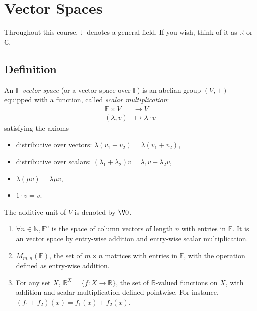\documentclass[a4paper]{article}
\theoremstyle{definition}
\begin{document}


\tableofcontents

\section{Vector Spaces}

\begin{convention}
  Throughout this course, $\mathbb{F}$ denotes a general field. If you wish, think of it as $\mathbb{R}$ or $\mathbb{C}$.
\end{convention}

\subsection{Definition}

\begin{definition}
  An $\mathbb{F}$-\emph{vector space} (or a vector space over $\mathbb{F}$) is an abelian group $(V, +)$ equipped with a function, called \emph{scalar multiplication}:
  \begin{align*}
    \mathbb{F}\times V &\to V \\
    (\lambda, v) &\mapsto \lambda\cdot v
  \end{align*}
  satisfying the axioms
  \begin{itemize}
  \item distributive over vectors: $\lambda(v_1+v_2) = \lambda(v_1+v_2)$,
  \item distributive over scalars: $(\lambda_1+\lambda_2)v= \lambda_1 v+\lambda_2 v$,
  \item $\lambda(\mu v) = \lambda \mu v$,
  \item $1\cdot v = v$.
  \end{itemize}
\end{definition}

The additive unit of $V$ is denoted by $\V 0$.

\begin{eg}\leavevmode
  \label{eg:matrix as V}
  \begin{enumerate}
  \item $\forall n \in \mathbb{N}, \mathbb{F}^n$ is the space of column vectors of length $n$ with entries in $\mathbb{F}$. It is an vector space by entry-wise addition and entry-wise scalar multiplication.
  \item $M_{m,n}(\mathbb{F})$, the set of $m\times n$ matrices with entries in $\mathbb{F}$, with the operation defined as entry-wise addition.
    \item For any set $X$, $\mathbb{R}^X = \{f: X \to \mathbb{R}\}$, the set of $\mathbb{R}$-valued functions on $X$, with addition and scalar multiplication defined pointwise. For instance, $(f_1+f_2)(x) = f_1(x)+f_2(x)$.
  \end{enumerate}
\end{eg}
\end{document}
